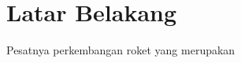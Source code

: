 \section{Latar Belakang}
\label{sec:latarbelakang}

Pesatnya perkembangan roket yang merupakan \lipsum[1]

\lipsum[2]

